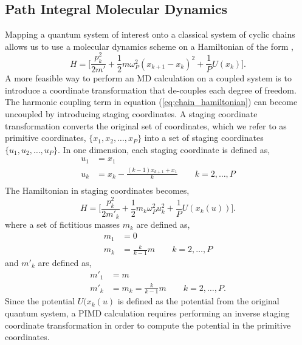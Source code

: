 \documentclass{article}
\newcommand{\be}{\begin{equation}}
\newcommand{\ee}{\end{equation}}
\begin{document}
\subsection{Path Integral Molecular Dynamics}
Mapping a quantum system of interest onto a classical system of cyclic chains allows us to use a molecular dynamics scheme on a Hamiltonian of the form
,
\be \label{eq:chain_hamiltonian}
  H = \Big[ \frac{p^2_k}{2m'} + \frac{1}{2} m \omega^2_P (x_{k+1} - x_k)^2 + \frac{1}{P} U(x_k) \Big] .
\ee
A more feasible way to perform an MD calculation on a coupled system is to introduce a coordinate transformation that de-couples each degree of freedom.
The harmonic coupling term in equation (\ref{eq:chain_hamiltonian}) can become uncoupled by introducing staging coordinates.\cite{tuckerman}
A staging coordinate transformation converts the original set of coordinates, which we refer to as primitive coordinates, $\{x_1 , x_2 , \dots , x_P \}$ into a set of staging coordinates $\{u_1 , u_2 , \dots , u_P \}$.
In one dimension, each staging coordinate is defined as,
\be
  \begin{split}
    u_1 &= x_1 \\
    u_k &= x_k - \frac{(k-1)x_{k+1} + x_1}{k} \quad \quad k = 2, \dots, P\\
  \end{split}
\ee
The Hamiltonian in staging coordinates becomes,
\be
  H = \Big[ \frac{p^2_k}{2m'_k} + \frac{1}{2} m_k \omega^2_P u_k^2 + \frac{1}{P} U(x_k(u)) \Big] .
\ee
where a set of fictitious masses $m_k$ are defined as,
\be
  \begin{split}
    m_1 &= 0 \\
    m_k &= \frac{k}{k-1} m \quad \quad k = 2, \dots, P
  \end{split}
\ee
and $m'_k$ are defined as,
\be
  \begin{split}
    m'_1 &= m \\
    m'_k &= m_k = \frac{k}{k-1} m \quad \quad k = 2, \dots, P .
  \end{split}
\ee
Since the potential $U(x_k(u)$ is defined as the potential from the original quantum system, a PIMD calculation requires performing an inverse staging coordinate transformation in order to compute the potential in the primitive coordinates.
\end{document}
